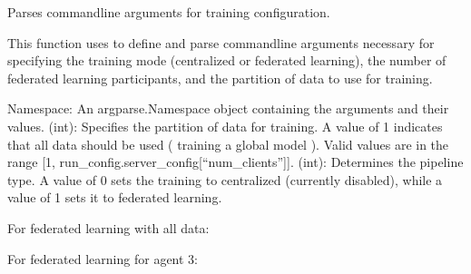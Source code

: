 \documentclass[letterpaper,10pt,english]{sphinxmanual}
\begin{document}
\begin{fulllineitems}
\label{\detokenize{insur_FL_client:insur_FL_client.parse_args}}
\pysigstartsignatures
{}
\pysigstopsignatures
\sphinxAtStartPar
Parses command\sphinxhyphen{}line arguments for training configuration.

\sphinxAtStartPar
This function uses  to define and parse command\sphinxhyphen{}line arguments necessary for specifying the training mode (centralized or federated learning), the number of federated learning participants, and the partition of data to use for training.
\begin{description}
\sphinxAtStartPar
Namespace: An argparse.Namespace object containing the arguments and their values. 
\sphinxhyphen{}  (int): Specifies the partition of data for training. A value of \sphinxhyphen{}1 indicates that all data should be used ( training a global model ). Valid values are in the range {[}\sphinxhyphen{}1, run\_config.server\_config{[}“num\_clients”{]}{]}.
\sphinxhyphen{}  (int): Determines the pipeline type. A value of 0 sets the training to centralized (currently disabled), while a value of 1 sets it to federated learning.

\sphinxAtStartPar
For federated learning with all data:

\sphinxAtStartPar
For federated learning for agent 3:

\end{description}

\end{fulllineitems}

\end{document}
